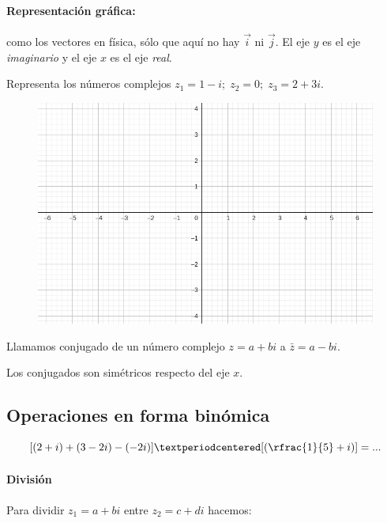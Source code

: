 \paragraph{Representación gráfica:} como los vectores en física, sólo que aquí no hay $\vec{i}$ ni $\vec{j}$. El eje $y$ es el eje \textit{imaginario} y el eje $x$ es el eje \textit{real}.

\begin{example} Representa los números complejos $z_1 = 1-i;\;z_2 = 0;\; z_3 = 2+3i$.

\begin{figure}[hbtp]
\centering
\includegraphics[scale=0.5]{../grid.png}
\end{figure}
\end{example}

\begin{defn} Llamamos conjugado de un número complejo $z = a+bi$ a $\bar{z} = a-bi$.

\obs Los conjugados son simétricos respecto del eje $x$.
\end{defn}

\subsection{Operaciones en forma binómica} 

\[
[(2+i)+(3-2i) - (-2i)]·[(\rfrac{1}{5}+i)] = ...
\]

\paragraph{División}

Para dividir $z_1 = a+bi$ entre $z_2 = c+di$ hacemos:

